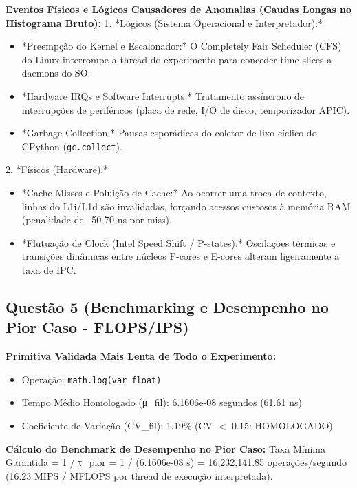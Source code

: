 \documentclass[10pt,a4paper]{article}
\begin{document}
\textbf{Eventos Físicos e Lógicos Causadores de Anomalias (Caudas Longas no Histograma Bruto):}
1. *Lógicos (Sistema Operacional e Interpretador):*
\begin{itemize}
  \item *Preempção do Kernel e Escalonador:* O Completely Fair Scheduler (CFS) do Linux interrompe a thread do experimento para conceder time-slices a daemons do SO.
  \item *Hardware IRQs e Software Interrupts:* Tratamento assíncrono de interrupções de periféricos (placa de rede, I/O de disco, temporizador APIC).
  \item *Garbage Collection:* Pausas esporádicas do coletor de lixo cíclico do CPython (\texttt{gc.collect}).
\end{itemize}

2. *Físicos (Hardware):*
\begin{itemize}
  \item *Cache Misses e Poluição de Cache:* Ao ocorrer uma troca de contexto, linhas do L1i/L1d são invalidadas, forçando acessos custosos à memória RAM (penalidade de ~50-70 ns por miss).
  \item *Flutuação de Clock (Intel Speed Shift / P-states):* Oscilações térmicas e transições dinâmicas entre núcleos P-cores e E-cores alteram ligeiramente a taxa de IPC.
\end{itemize}


\subsection*{Questão 5 (Benchmarking e Desempenho no Pior Caso - FLOPS/IPS)}
\textbf{Primitiva Validada Mais Lenta de Todo o Experimento:}
\begin{itemize}
  \item Operação: \texttt{math.log(var float)}
  \item Tempo Médio Homologado (μ\_fil): 6.1606e-08 segundos (61.61 ns)
  \item Coeficiente de Variação (CV\_fil): 1.19\% (CV $<$ 0.15: HOMOLOGADO)
\end{itemize}


\textbf{Cálculo do Benchmark de Desempenho no Pior Caso:}
Taxa Mínima Garantida = 1 / τ\_pior = 1 / (6.1606e-08 s)
= 16,232,141.85 operações/segundo (16.23 MIPS / MFLOPS por thread de execução interpretada).
\end{document}
